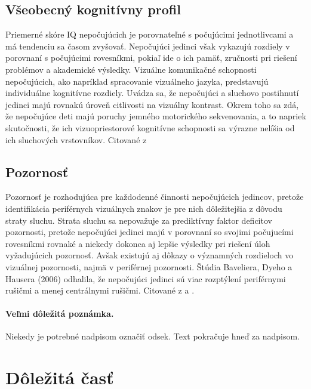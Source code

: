 \documentclass[10pt,twoside,slovak,a4paper]{article}
\begin{document}
\subsection{Všeobecný kognitívny profil} \label{rozdiely:vseob}
Priemerné skóre IQ nepočujúcich je porovnateľné s počujúcimi jednotlivcami a má tendenciu sa časom zvyšovať. Nepočujúci jedinci však vykazujú rozdiely v porovnaní s počujúcimi rovesníkmi, pokiaľ ide o ich pamäť, zručnosti pri riešení problémov a akademické výsledky. Vizuálne komunikačné schopnosti nepočujúcich, ako napríklad spracovanie vizuálneho jazyka, predstavujú individuálne kognitívne rozdiely. Uvádza sa, že nepočujúci a sluchovo postihnutí jedinci majú rovnakú úroveň citlivosti na vizuálny kontrast. Okrem toho sa zdá, že nepočujúce deti majú poruchy jemného motorického sekvenovania, a to napriek skutočnosti, že ich vizuopriestorové kognitívne schopnosti sa výrazne nelíšia od ich sluchových vrstovníkov.
Citované z \cite{pappas2018learning}


\subsection{Pozornosť} \label{rozdiely:pozornost}
Pozornosť je rozhodujúca pre každodenné činnosti nepočujúcich jedincov, pretože identifikácia periférnych vizuálnych znakov je pre nich dôležitejšia z dôvodu straty sluchu. Strata sluchu sa nepovažuje za prediktívny faktor deficitov pozornosti, pretože nepočujúci jedinci majú v porovnaní so svojimi počujucími rovesníkmi rovnaké a niekedy dokonca aj lepšie výsledky pri riešení úloh vyžadujúcich pozornosť. Avšak existujú aj dôkazy o významných rozdieloch vo vizuálnej pozornosti, najmä v periférnej pozornosti. Štúdia Baveliera, Dyeho a Hausera (2006) odhalila, že nepočujúci jedinci sú viac rozptýlení periférnymi rušičmi a menej centrálnymi rušičmi.
Citované z \cite{bavelier2006deaf} a \cite{pappas2018learning}.

\paragraph{Veľmi dôležitá poznámka.}
Niekedy je potrebné nadpisom označiť odsek. Text pokračuje hneď za nadpisom.



\section{Dôležitá časť} \label{dolezita}
\end{document}
